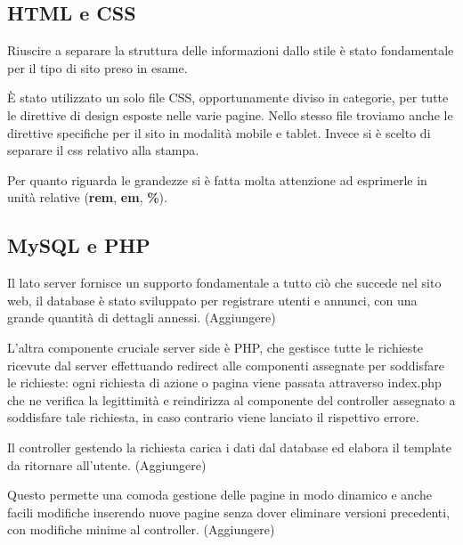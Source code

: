 	\subsection{HTML e CSS}
	\par Riuscire a separare la struttura delle informazioni dallo stile è stato fondamentale per il tipo di sito preso in esame.
	\par \`E stato utilizzato un solo file CSS, opportunamente diviso in categorie, per tutte le direttive di design esposte nelle varie pagine. Nello stesso file troviamo anche le direttive specifiche per il sito in modalità mobile e tablet. Invece si è scelto di separare il css relativo alla stampa. 
	\par Per quanto riguarda le grandezze si è fatta molta attenzione ad esprimerle in unità relative (\textbf{rem}, \textbf{em}, \textbf{\%}).
	\subsection{MySQL e PHP}
	\par Il lato server fornisce un supporto fondamentale a tutto ciò che succede nel sito web, il database è stato sviluppato per registrare utenti e annunci, con una grande quantità di dettagli annessi. (Aggiungere)
	\par L’altra componente cruciale server side è PHP, che gestisce tutte le richieste ricevute dal server effettuando redirect alle componenti assegnate per soddisfare le richieste: ogni richiesta di azione o pagina viene passata attraverso index.php che ne verifica la legittimità e reindirizza al componente del controller assegnato a soddisfare tale richiesta, in caso contrario viene lanciato il rispettivo errore. 
	\par Il controller gestendo la richiesta carica i dati dal database ed elabora il template da ritornare all’utente. (Aggiungere)
	\par Questo permette una comoda gestione delle pagine in modo dinamico e anche facili modifiche inserendo nuove pagine senza dover eliminare versioni precedenti, con modifiche minime al controller. (Aggiungere)
